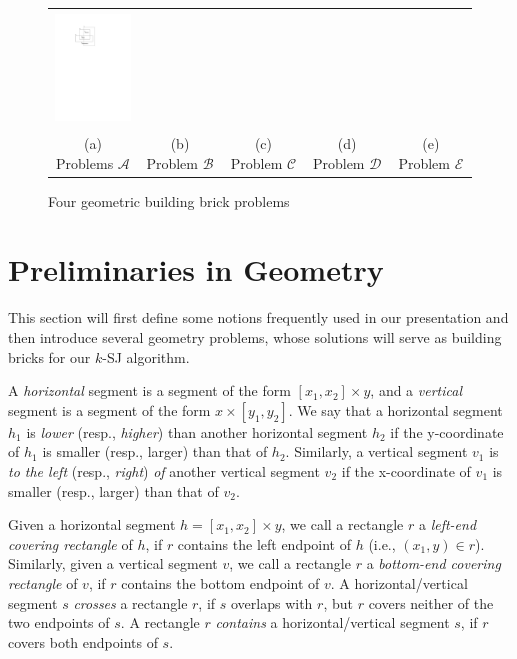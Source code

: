 \documentclass[sigconf]{acmart}
\def\vgap{\vspace{1mm}}
\def\extraspacing{\vspace{2mm} \noindent}
\def\figcapup{\vspace{-0mm}}
\def\figcapdown{\vspace{-0mm}}
\begin{document}
\begin{figure}
\begin{tabular}{ccccc}
        \includegraphics[height=30mm]{./artwork/prob-e} \\[2mm]
        (a) Problems $\mathscr{A}$ &
        \hspace{3mm}
        (b) Problem $\mathscr{B}$ &
        \hspace{3mm}
        (c) Problem $\mathscr{C}$ &
        \hspace{3mm}
        (d) Problem $\mathscr{D}$ &
        \hspace{3mm}
        (e) Problem $\mathscr{E}$
    \end{tabular}

    \figcapup
    \caption{Four geometric building brick problems}
    \label{fig:probs}
    \figcapdown
\end{figure}

\section{Preliminaries in Geometry} \label{sec:bricks}

This section will first define some notions frequently used in our presentation and then introduce several  geometry problems, whose solutions will serve as building bricks for our $k$-SJ algorithm.

\extraspacing {\bf Terminology.} A {\em horizontal} segment is a segment of the form $[x_1, x_2] \times y$, and a {\em vertical} segment is a segment of the form $x \times [y_1, y_2]$. We say that a horizontal segment $h_1$ is {\em lower} (resp., {\em higher}) than another horizontal segment $h_2$ if the y-coordinate of $h_1$ is smaller (resp., larger) than that of $h_2$. Similarly, a vertical segment $v_1$ is {\em to the left} (resp., {\em right}) {\em of} another vertical segment $v_2$ if the x-coordinate of $v_1$ is smaller (resp., larger) than that of $v_2$.

\vgap

Given a horizontal segment $h = [x_1, x_2] \times y$, we call a rectangle $r$ a {\em left-end covering rectangle} of $h$, if $r$ contains the left endpoint of $h$ (i.e., $(x_1, y) \in r$). Similarly, given a vertical segment $v$, we call a rectangle $r$ a {\em bottom-end covering rectangle} of $v$, if $r$ contains the bottom endpoint of $v$.  A horizontal/vertical segment $s$ {\em crosses} a rectangle $r$, if $s$ overlaps with $r$, but $r$ covers neither of the two endpoints of $s$. A rectangle $r$ {\em contains} a horizontal/vertical segment $s$, if $r$ covers both endpoints of $s$.
\end{document}
